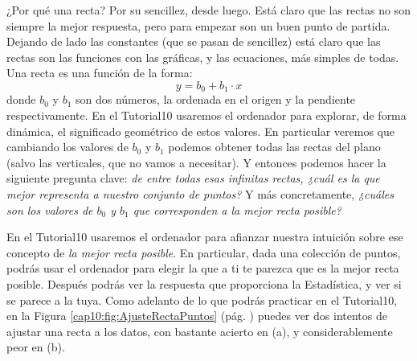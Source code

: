 ¿Por qué una recta? Por su sencillez, desde luego. Está claro que las rectas no son siempre la mejor respuesta, pero para empezar son un buen punto de partida. Dejando de lado las constantes (que se pasan de sencillez) está claro que las rectas son las funciones con las gráficas, y las ecuaciones, más simples de todas. Una recta es una función de la forma:
\[y=b_0+b_1\cdot x\]
donde $b_0$ y $b_1$ son dos números, la {\sf ordenada en el origen} y la  {\sf pendiente} respectivamente. En el Tutorial10 usaremos el ordenador para explorar, de forma dinámica, el significado geométrico de estos valores.
En particular veremos que cambiando los valores de $b_0$ y $b_1$ podemos obtener todas las rectas del plano (salvo las verticales, que no vamos a necesitar). Y entonces podemos hacer la siguiente pregunta clave: {\em de entre todas esas infinitas rectas, ¿cuál es la que mejor representa a nuestro conjunto de puntos?} Y más concretamente, {\em ¿cuáles son los valores de $b_0$ y $b_1$ que corresponden a la mejor recta posible?}

En el Tutorial10 usaremos el ordenador para afianzar nuestra intuición sobre ese concepto de  {\em la mejor recta posible}. En particular, dada una colección de puntos, podrás usar el ordenador para elegir la que a ti te parezca que es la mejor recta posible. Después podrás ver la respuesta que proporciona la Estadística, y ver si se parece a la tuya.
%
%
Como adelanto de lo que podrás practicar en el Tutorial10, en la Figura \ref{cap10:fig:AjusteRectaPuntos} (pág. \pageref{cap10:fig:AjusteRectaPuntos}) puedes ver dos intentos de ajustar una recta a los datos, con bastante acierto en (a), y considerablemente peor  en (b).


